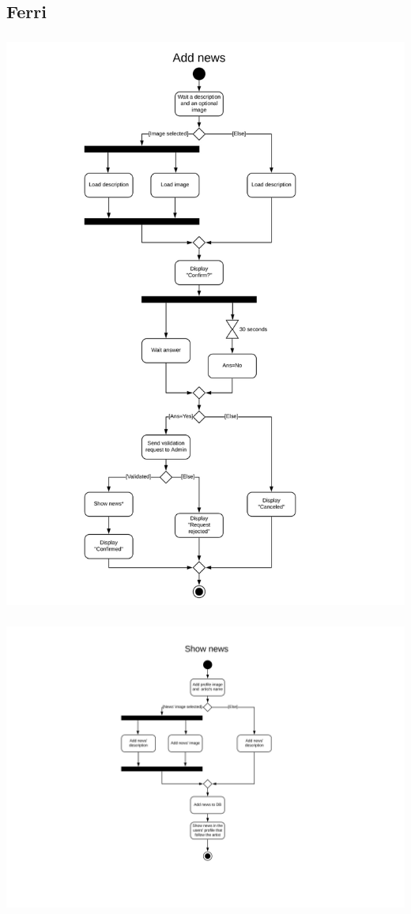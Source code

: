 \documentclass[11pt,a4paper]{article}
\begin{document}
\subsection{Ferri}
\subsubsection{}
\includegraphics[scale=0.2]{AD1Ferri.jpg}
\subsubsection{}
\includegraphics[scale=0.2]{AD2Ferri.jpg}
\end{document}
